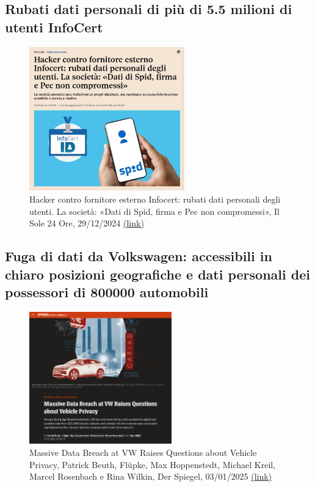 \documentclass{beamer}
\begin{document}
\subsection*{Rubati dati personali di più di 5.5 milioni di utenti InfoCert}
\begin{frame}{\insertsection}{\insertsubsection}
\begin{figure}
\includegraphics[width=0.6\textwidth]{imgs/news-ilsole24ore-infocert.png}
\caption{Hacker contro fornitore esterno Infocert: rubati dati personali degli
utenti. La società: «Dati di Spid, firma e Pec non compromessi», Il Sole 24 Ore,
29/12/2024
\href{https://www.ilsole24ore.com/art/spid-hacker-contro-infocert-rubate-informazioni-milioni-utenti-AGnDOQ2B}{(link)}}
\end{figure}
\end{frame}

\subsection*{Fuga di dati da Volkswagen: accessibili in chiaro posizioni geografiche e dati personali dei possessori di 800000 automobili}
\begin{frame}{\insertsection}{\insertsubsection}
\begin{figure}
\includegraphics[width=0.55\textwidth]{imgs/news-spiegel-vw-dataleak.png}
\caption{Massive Data Breach at VW Raises Questions about Vehicle Privacy,
Patrick Beuth, Flüpke, Max Hoppenstedt, Michael Kreil, Marcel Rosenbach e Rina
Wilkin, Der Spiegel, 03/01/2025
\href{https://www.spiegel.de/international/business/we-know-where-you-parked-massive-data-breach-at-vw-raises-questions-about-vehicle-privacy-a-4b1cb926-2edb-42ea-92fb-5000cd378fc5}{(link)}}
\end{figure}
\end{frame}
\end{document}
